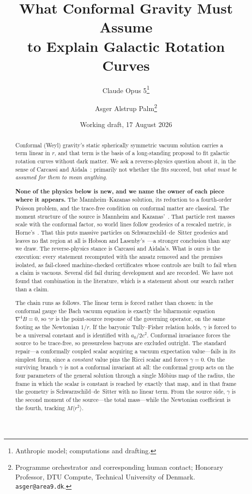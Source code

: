 \documentclass[11pt]{article}
\title{What Conformal Gravity Must Assume\\
\large to Explain Galactic Rotation Curves}
\author{Claude Opus 5\thanks{Anthropic model; computations and drafting.}
\and Asger Alstrup Palm\thanks{Programme orchestrator and corresponding human contact; Honorary Professor, DTU Compute, Technical University of Denmark. \texttt{asger@area9.dk}.}}
\date{Working draft, 17 August 2026}
\theoremstyle{definition}
\theoremstyle{remark}
\begin{document}
\maketitle

\begin{abstract}
Conformal (Weyl) gravity's static spherically symmetric vacuum solution
carries a term linear in \(r\), and that term is the basis of a long-standing
proposal to fit galactic rotation curves without dark matter.  We ask a
reverse-physics question about it, in the sense of Carcassi and
Aidala~\cite{CarcassiAidala2022,AoP}: primarily not whether the fits succeed, but
\emph{what must be assumed for them to mean anything}.

\textbf{None of the physics below is new, and we name the owner of each piece
where it appears.}  The Mannheim--Kazanas solution, its reduction to a
fourth-order Poisson problem, and the trace-free condition on conformal matter
are classical.  The moment structure of the source is Mannheim and
Kazanas'~\cite{MK1994}.  That particle rest masses scale with the conformal
factor, so world lines follow geodesics of a rescaled metric, is
Horne's~\cite{Horne2016}.  That this puts massive particles on
Schwarzschild--de~Sitter geodesics and leaves no flat region at all is Hobson
and Lasenby's~\cite{HobsonLasenby2021,HobsonLasenby2022}---a stronger
conclusion than any we draw.  The reverse-physics stance is Carcassi and
Aidala's.  What is ours is the execution: every statement recomputed with the
ansatz removed and the premises isolated, as fail-closed machine-checked
certificates whose controls are built to fail when a claim is vacuous.
Several did fail during development and are recorded.  We have not found that
combination in the literature, which is a statement about our search rather
than a claim.

The chain runs as follows.  The linear term is forced rather than chosen: in
the conformal gauge the Bach vacuum equation is exactly the biharmonic
equation \(\nabla^{4}B=0\), so \(\gamma r\) is the point-source response of
the governing operator, on the same footing as the Newtonian \(1/r\).  If the
baryonic Tully--Fisher relation holds, \(\gamma\) is forced to be a universal
constant and is identified with \(a_{0}/2c^{2}\).  Conformal invariance forces
the source to be trace-free, so pressureless baryons are excluded outright.
The standard repair---a conformally coupled scalar acquiring a vacuum
expectation value---fails in its simplest form, since a \emph{constant} value
pins the Ricci scalar and forces \(\gamma=0\).  On the surviving branch
\(\gamma\) is not a conformal invariant at all: the conformal group acts on
the four parameters of the general solution through a single M\"obius map of
the radius, the frame in which the scalar is constant is reached by exactly
that map, and in that frame the geometry is Schwarzschild--de~Sitter with no
linear term.  From the source side, \(\gamma\) is the second moment of the
source---the total mass---while the Newtonian coefficient is the fourth,
tracking \(M\langle r^{2}\rangle\).


\end{abstract}
\end{document}

